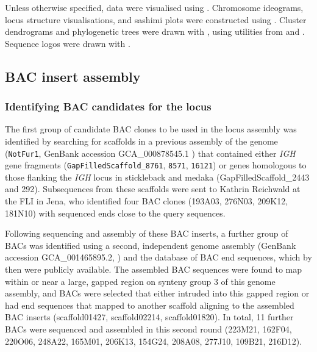Unless otherwise specified, data were visualised using  \parencite{wickham2016ggplot2}. Chromosome ideograms, locus structure visualisations, and sashimi plots were constructed using  \parencite{hahne2016gviz}. Cluster dendrograms and phylogenetic trees were drawn with  \parencite{guangchuang2018ggtree}, using utilities from  \parencite{paradis2018ape} and  \parencite{guangchuang2018tidytree}. Sequence logos were drawn with  \parencite{wagih2017ggseqlogo}. 

\subsection{BAC insert assembly}
\label{sec:methods_comp_bacs}

\subsubsection{Identifying BAC candidates for the \nfu \igh{} locus}
\label{sec:methods_comp_bacs_ident}

The first group of candidate BAC clones to be used in the \Nfu locus assembly was identified by searching for scaffolds in a previous assembly of the \Nfu genome (\texttt{NotFur1}, GenBank accession GCA\_000878545.1 \parencite{valenzano2015genome}) that contained either \textit{IGH} gene fragments (\texttt{GapFilledScaffold\_8761}, \texttt{8571}, \texttt{16121}) or genes homologous to those flanking the \textit{IGH} locus in stickleback and medaka (GapFilledScaffold\_2443 and 292). Subsequences from these scaffolds were sent to Kathrin Reichwald at the FLI in Jena, who identified four BAC clones (193A03, 276N03, 209K12, 181N10) with sequenced ends close to the query sequences.

Following sequencing and assembly of these BAC inserts, a further group of BACs was identified using a second, independent genome assembly (GenBank accession 	GCA\_001465895.2, \parencite{reichwald2015genome}) and the database of BAC end sequences, which by then were publicly available. The assembled BAC sequences were found to map within or near a large, gapped region on synteny group 3 of this genome assembly, and BACs were selected that either intruded into this gapped region or had end sequences that mapped to another scaffold aligning to the assembled BAC inserts (scaffold01427, scaffold02214, scaffold01820). In total, 11 further BACs were sequenced and assembled in this second round (223M21, 162F04, 220O06, 248A22, 165M01, 206K13, 154G24, 208A08, 277J10, 109B21, 216D12).

